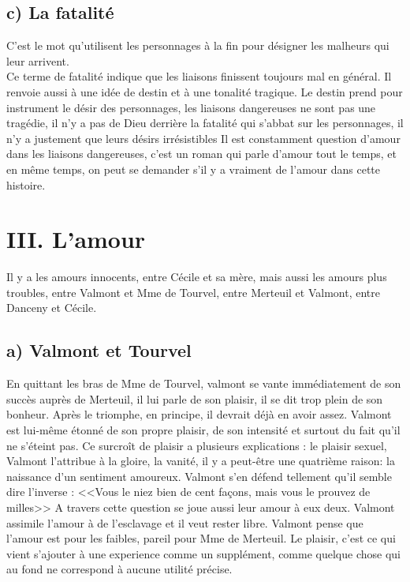 \documentclass[12pt]{article}
\begin{document}
\subsection*{c) La fatalité} 
C'est le mot qu'utilisent les personnages à la fin pour désigner les malheurs qui leur arrivent.\\
Ce terme de fatalité indique que les liaisons finissent toujours mal en général.
Il renvoie aussi à une idée de destin et à une tonalité tragique.
Le destin prend pour instrument le désir des personnages, les liaisons dangereuses ne sont pas une tragédie, il n'y a pas de Dieu derrière la fatalité qui s'abbat sur les personnages, il n'y a justement que leurs désirs irrésistibles
Il est constamment question d'amour dans les liaisons dangereuses, c'est un roman qui parle d'amour tout le temps, et en même temps, on peut se demander s'il y a vraiment de l'amour dans cette histoire.
\section*{III. L'amour}
Il y a les amours innocents, entre Cécile et sa mère, mais aussi les amours plus troubles, entre Valmont et Mme de Tourvel, entre Merteuil et Valmont, entre Danceny et Cécile.
\subsection*{a) Valmont et Tourvel}
En quittant les bras de Mme de Tourvel, valmont se vante immédiatement de son succès auprès de Merteuil, il lui parle de son plaisir, il se dit trop plein de son bonheur. Après le triomphe, en principe, il devrait déjà en avoir assez.
Valmont est lui-même étonné de son propre plaisir, de son intensité et surtout du fait qu'il ne s'éteint pas.
Ce surcroît de plaisir a plusieurs explications : le plaisir sexuel, Valmont l'attribue à la gloire, la vanité, il y a peut-être une quatrième raison: la naissance d'un sentiment amoureux. Valmont s'en défend tellement qu'il semble dire l'inverse : <<Vous le niez bien de cent façons, mais vous le prouvez de milles>>
A travers cette question se joue aussi leur amour à eux deux. Valmont assimile l'amour à de l'esclavage et il veut rester libre.
Valmont pense que l'amour est pour les faibles, pareil pour Mme de Merteuil. 
Le plaisir, c'est ce qui vient s'ajouter à une experience comme un supplément, comme quelque chose qui au fond ne correspond à aucune utilité précise.
\end{document}
